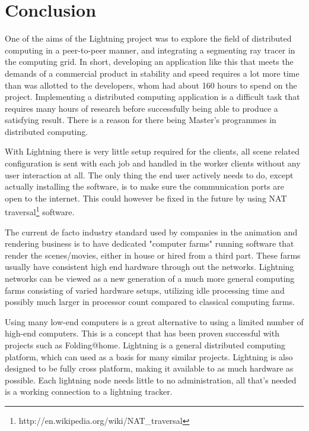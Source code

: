 

\section{Conclusion}
One of the aims of the Lightning project was to explore the field of distributed
computing in a peer-to-peer manner, and integrating a segmenting ray tracer in
the computing grid. In short, developing an application like this that meets 
the demands of a commercial product in stability and speed requires a lot more 
time than was allotted to the developers, whom had about 160 hours to spend on
the project. Implementing a distributed computing application is a difficult
task that requires many hours of research before successfully being able to
produce a satisfying result. There is a reason for there being Master's
programmes in distributed computing.


With Lightning there is very little setup required for the clients,
all scene related configuration is sent with each job and handled in the
worker clients without any user interaction at all. The only thing the end
user actively needs to do, except actually installing the software, is to
make sure the communication ports are open to the internet. This could however
be fixed in the future by using NAT traversal\footnote{http://en.wikipedia.org/wiki/NAT\_traversal} software.

The current de facto industry standard used by companies in the animation and
rendering business is to have dedicated "computer farms" running software
that render the scenes/movies, either in house or hired from a third part.
These farms usually have  consistent high end hardware through out the
networks. Lightning networks can be viewed as a new generation of a much
more general computing farms consisting of varied hardware setups, utilizing
idle processing time and possibly much larger in processor count compared to
classical computing farms.


Using many low-end computers is a great alternative to using a limited number
of high-end computers. This is a concept that has been proven successful
with projects such as Folding@home. Lightning is a general distributed
computing platform, which can used as a basis for many similar projects.
Lightning is also designed to be fully cross platform, making it available to
as much hardware as possible. Each lightning node needs little to no
administration, all that's needed is a working connection to a lightning
tracker.

